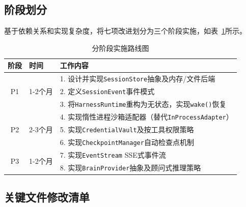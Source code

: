 \documentclass[12pt,a4paper]{ctexart}
\begin{document}
\subsection{阶段划分}

基于依赖关系和实现复杂度，将七项改进划分为三个阶段实施，如表~\ref{tab:roadmap}所示。

\begin{table}[H]
\centering
\caption{分阶段实施路线图}\label{tab:roadmap}
\begin{tabular}{@{}clp{8cm}@{}}
\toprule
\textbf{阶段} & \textbf{时间} & \textbf{工作内容} \\
\midrule
\multirow{3}{*}{P1} & \multirow{3}{*}{1-2个月} & 1. 设计并实现\texttt{SessionStore}抽象及内存/文件后端 \\
 & & 2. 定义\texttt{SessionEvent}事件模式 \\
 & & 3. 将\texttt{HarnessRuntime}重构为无状态，实现\texttt{wake()}恢复 \\
\midrule
\multirow{3}{*}{P2} & \multirow{3}{*}{2-3个月} & 4. 实现惰性进程沙箱适配器（替代\texttt{InProcessAdapter}） \\
 & & 5. 实现\texttt{CredentialVault}及按工具权限策略 \\
 & & 6. 实现\texttt{CheckpointManager}自动检查点机制 \\
\midrule
\multirow{2}{*}{P3} & \multirow{2}{*}{1-2个月} & 7. 实现\texttt{EventStream} SSE式事件流 \\
 & & 8. 实现\texttt{BrainProvider}抽象及顾问式推理策略 \\
\bottomrule
\end{tabular}
\end{table}

\subsection{关键文件修改清单}
\end{document}

